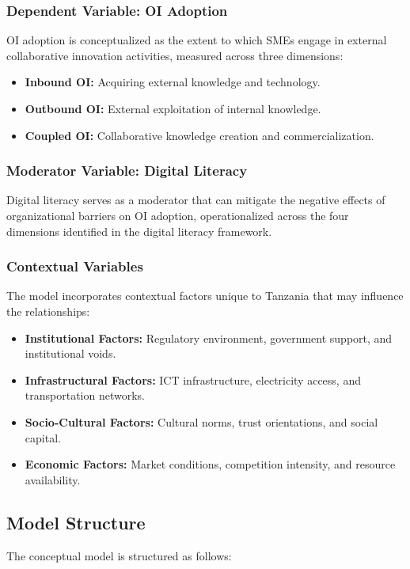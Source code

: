\subsubsection{Dependent Variable: OI Adoption}
OI adoption is conceptualized as the extent to which SMEs engage in external collaborative innovation activities, measured across three dimensions:
\begin{itemize}
    \item \textbf{Inbound OI:} Acquiring external knowledge and technology.
    \item \textbf{Outbound OI:} External exploitation of internal knowledge.
    \item \textbf{Coupled OI:} Collaborative knowledge creation and commercialization.
\end{itemize}

\subsubsection{Moderator Variable: Digital Literacy}
Digital literacy serves as a moderator that can mitigate the negative effects of organizational barriers on OI adoption, operationalized across the four dimensions identified in the digital literacy framework.

\subsubsection{Contextual Variables}
The model incorporates contextual factors unique to Tanzania that may influence the relationships:
\begin{itemize}
    \item \textbf{Institutional Factors:} Regulatory environment, government support, and institutional voids.
    \item \textbf{Infrastructural Factors:} ICT infrastructure, electricity access, and transportation networks.
    \item \textbf{Socio-Cultural Factors:} Cultural norms, trust orientations, and social capital.
    \item \textbf{Economic Factors:} Market conditions, competition intensity, and resource availability.
\end{itemize}

\subsection{Model Structure}

The conceptual model is structured as follows:

